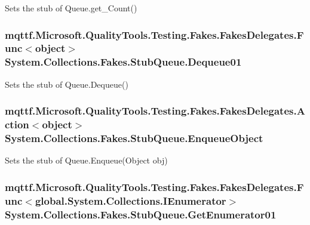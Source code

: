 Sets the stub of Queue.\-get\-\_\-\-Count()

\hypertarget{class_system_1_1_collections_1_1_fakes_1_1_stub_queue_a37f0ac0c812ae36caeb4d89c5ae19e04}{
\subsubsection[{Dequeue01}]{\setlength{\rightskip}{0pt plus 5cm}mqttf.\-Microsoft.\-Quality\-Tools.\-Testing.\-Fakes.\-Fakes\-Delegates.\-Func$<$object$>$ System.\-Collections.\-Fakes.\-Stub\-Queue.\-Dequeue01}}\label{class_system_1_1_collections_1_1_fakes_1_1_stub_queue_a37f0ac0c812ae36caeb4d89c5ae19e04}


Sets the stub of Queue.\-Dequeue()

\hypertarget{class_system_1_1_collections_1_1_fakes_1_1_stub_queue_a25d26ae6deb94c05340cd9109516e352}{
\subsubsection[{Enqueue\-Object}]{\setlength{\rightskip}{0pt plus 5cm}mqttf.\-Microsoft.\-Quality\-Tools.\-Testing.\-Fakes.\-Fakes\-Delegates.\-Action$<$object$>$ System.\-Collections.\-Fakes.\-Stub\-Queue.\-Enqueue\-Object}}\label{class_system_1_1_collections_1_1_fakes_1_1_stub_queue_a25d26ae6deb94c05340cd9109516e352}


Sets the stub of Queue.\-Enqueue(\-Object obj)

\hypertarget{class_system_1_1_collections_1_1_fakes_1_1_stub_queue_a9865651f4c18621306b476c9fe6cf8bc}{
\subsubsection[{Get\-Enumerator01}]{\setlength{\rightskip}{0pt plus 5cm}mqttf.\-Microsoft.\-Quality\-Tools.\-Testing.\-Fakes.\-Fakes\-Delegates.\-Func$<$global.\-System.\-Collections.\-I\-Enumerator$>$ System.\-Collections.\-Fakes.\-Stub\-Queue.\-Get\-Enumerator01}}\label{class_system_1_1_collections_1_1_fakes_1_1_stub_queue_a9865651f4c18621306b476c9fe6cf8bc}


